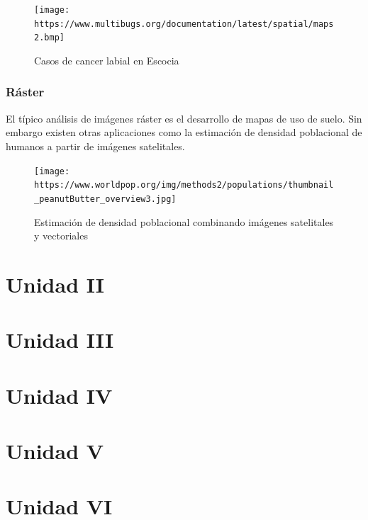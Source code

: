 \documentclass[
]{book}
\begin{document}
\begin{figure}
\centering
\texttt{[image: https://www.multibugs.org/documentation/latest/spatial/maps2.bmp]}
\caption{Casos de cancer labial en Escocia}
\end{figure}

\hypertarget{ruxe1ster}{%
\subsection{Ráster}\label{ruxe1ster}}

El típico análisis de imágenes ráster es el desarrollo de mapas de uso de suelo. Sin embargo existen otras aplicaciones como la estimación de densidad poblacional de humanos a partir de imágenes satelitales.

\begin{figure}
\centering
\texttt{[image: https://www.worldpop.org/img/methods2/populations/thumbnail\_peanutButter\_overview3.jpg]}
\caption{Estimación de densidad poblacional combinando imágenes satelitales y vectoriales}
\end{figure}

\hypertarget{unidad-ii}{%
\chapter{Unidad II}\label{unidad-ii}}

\hypertarget{unidad-iii}{%
\chapter{Unidad III}\label{unidad-iii}}

\hypertarget{unidad-iv}{%
\chapter{Unidad IV}\label{unidad-iv}}

\hypertarget{unidad-v}{%
\chapter{Unidad V}\label{unidad-v}}

\hypertarget{unidad-vi}{%
\chapter{Unidad VI}\label{unidad-vi}}

  
\end{document}
